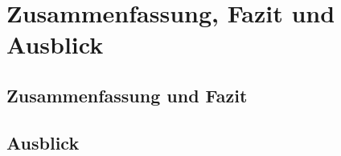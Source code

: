 

\pagestyle{fancy}
\rhead{\thepage} \chead{} 
\cfoot{}

\section{Zusammenfassung, Fazit und Ausblick}\label{Sec11}


\subsection{Zusammenfassung und Fazit}\label{Sec11Sub1}

\subsection{Ausblick}\label{Sec11Sub2}

\newpage